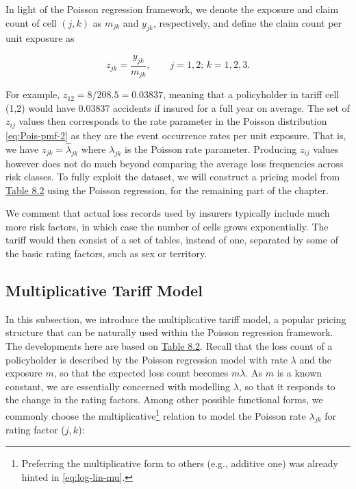 \documentclass[]{book}
\let\rmarkdownfootnote\footnote%
\def\footnote{\protect\rmarkdownfootnote}
\theoremstyle{definition}
\theoremstyle{definition}
\theoremstyle{definition}
\theoremstyle{remark}
\begin{document}
In light of the Poisson regression framework, we denote the exposure and
claim count of cell \((j,k)\) as \(m_{jk}\) and \(y_{jk}\),
respectively, and define the claim count per unit exposure as

\begin{equation}
\nonumber
z_{jk}= \frac{y_{jk}}{ m_{jk}}, \qquad j=1,2;\, k=1, 2,3.
\end{equation}

For example, \(z_{12}=8/208.5=0.03837\), meaning that a policyholder in
tariff cell (1,2) would have 0.03837 accidents if insured for a full
year on average. The set of \(z_{ij}\) values then corresponds to the
rate parameter in the Poisson distribution \eqref{eq:Pois-pmf-2} as they
are the event occurrence rates per unit exposure. That is, we have
\(z_{jk}=\hat{\lambda}_{jk}\) where \({\lambda}_{jk}\) is the Poisson
rate parameter. Producing \(z_{ij}\) values however does not do much
beyond comparing the average loss frequencies across risk classes. To
fully exploit the dataset, we will construct a pricing model from
\protect\hyperlink{tab:8.2}{Table 8.2} using the Poisson regression, for
the remaining part of the chapter.

We comment that actual loss records used by insurers typically include
much more risk factors, in which case the number of cells grows
exponentially. The tariff would then consist of a set of tables, instead
of one, separated by some of the basic rating factors, such as sex or
territory.

\subsection{Multiplicative Tariff
Model}\label{multiplicative-tariff-model}

In this subsection, we introduce the multiplicative tariff model, a
popular pricing structure that can be naturally used within the Poisson
regression framework. The developments here are based on
\protect\hyperlink{tab:8.2}{Table 8.2}. Recall that the loss count of a
policyholder is described by the Poisson regression model with rate
\(\lambda\) and the exposure \(m\), so that the expected loss count
becomes \(m\lambda\). As \(m\) is a known constant, we are essentially
concerned with modelling \(\lambda\), so that it responds to the change
in the rating factors. Among other possible functional forms, we
commonly choose the multiplicative\footnote{Preferring the
  multiplicative form to others (e.g., additive one) was already hinted
  in \eqref{eq:log-lin-mu}.} relation to model the Poisson rate
\(\lambda_{jk}\) for rating factor (\(j,k\)):
\end{document}
